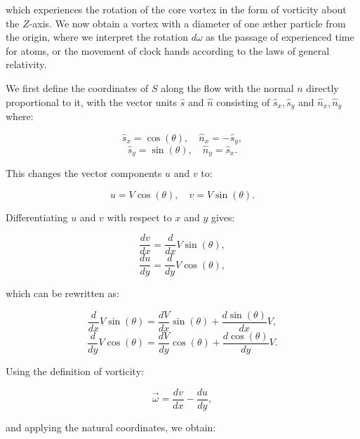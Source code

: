 \documentclass[a4paper,10pt]{article}
\begin{document}
which experiences the rotation of the core vortex in the form of vorticity about the $Z$-axis. We now obtain a vortex with a diameter of one æther particle from the origin, where we interpret the rotation $d\omega$ as the passage of experienced time for atoms, or the movement of clock hands according to the laws of general relativity.


We first define the coordinates of $S$ along the flow with the normal $n$ directly proportional to it, with the vector units $\hat{s}$ and $\hat{n}$ consisting of $\hat{s}_x, \hat{s}_y$ and $\hat{n}_x, \hat{n}_y$ where:


\begin{equation*}
\hat{s}_x=\cos (\theta), \quad \hat{n}_x=-\hat{s}_y,
\end{equation*}
\begin{equation*}
\hat{s}_y=\sin (\theta), \quad \hat{n}_y=\hat{s}_x.
\end{equation*}


This changes the vector components $u$ and $v$ to:


\begin{equation*}
u=V \cos (\theta), \quad v=V \sin (\theta).
\end{equation*}


Differentiating $u$ and $v$ with respect to $x$ and $y$ gives:


\begin{equation*}
\frac{d v}{d x}=\frac{d}{d x} V \sin (\theta),
\end{equation*}
\begin{equation*}
\frac{d u}{d y}=\frac{d}{d y} V \cos (\theta),
\end{equation*}


which can be rewritten as:


\begin{equation*}
\frac{d}{d x} V \sin (\theta) = \frac{d V}{d x} \sin (\theta) + \frac{d \sin (\theta)}{d x} V,
\end{equation*}
\begin{equation*}
\frac{d}{d y} V \cos (\theta) = \frac{d V}{d y} \cos (\theta) + \frac{d \cos (\theta)}{d y} V.
\end{equation*}


Using the definition of vorticity:


\begin{equation*}
\vec{\omega} = \frac{d v}{d x} - \frac{d u}{d y},
\end{equation*}


and applying the natural coordinates, we obtain:
\end{document}
